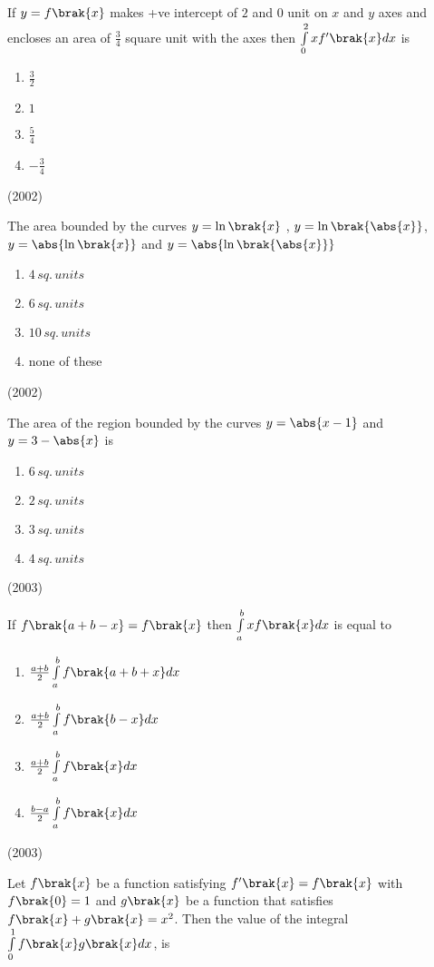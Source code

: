 		If $y=f\brak{x}$ makes +ve intercept of $2$ and $0$ unit on $x$ and $y$ axes and encloses an area of $\frac{3}{4}$ square unit with the axes then $\int \limits_0^2 x f^{\prime}\brak{x}dx$ is
			\begin{enumerate}
				\itemsep0.3em
				\item $\frac{3}{2}$
				\item $1$
				\item $\frac{5}{4}$
				\item $-\frac{3}{4}$
			\end{enumerate}
			\hfill (2002)
	\item
		The area bounded by the curves $y= \ln \brak{x}$ , $y= \ln \brak{\abs{x}}$, $y=\abs{\ln\brak{x}}$ and $y=\abs{\ln \brak{\abs{x}}}$
			\begin{enumerate}
					\item $4 \, sq. \, units$
					\item $6 \, sq. \, units$
					\item $10 \, sq. \, units$
					\item none of these
			\end{enumerate}
			\hfill(2002)
	\item
		The area of the region bounded by the curves $y= \abs{x-1}$ and $y=3-\abs{x}$ is
			\begin {enumerate}
				\item $6 \, sq. \, units$
				\item $2 \, sq. \, units$
				\item $3 \, sq. \, units$
				\item $4 \, sq. \, units$
			\end {enumerate}
			\hfill (2003)
	\item
		If $f\brak{a+b-x}=f\brak{x}$ then $\int \limits_a^b xf\brak{x}dx$ is equal to
			\begin {enumerate}
				\itemsep0.3em
				\item $\frac{a+b}{2} \int \limits_a^b f\brak{a+b+x}dx$
				\item $\frac{a+b}{2} \int \limits_a^b f\brak{b-x}dx$
				\item $\frac{a+b}{2} \int \limits_a^b f\brak{x}dx$
				\item $\frac{b-a}{2} \int \limits_a^b f\brak{x}dx$
			\end {enumerate}
			\hfill (2003)
	\item 
		Let $f\brak{x}$ be a function satisfying $f^{\prime}\brak{x} = f\brak{x}$ with $f\brak{0}=1$ and $g\brak{x}$ be a function that satisfies $f\brak{x} + g\brak{x}=x^2$. Then the value of the integral $\int \limits_0^1 f\brak{x}g\brak{x}dx$, is
